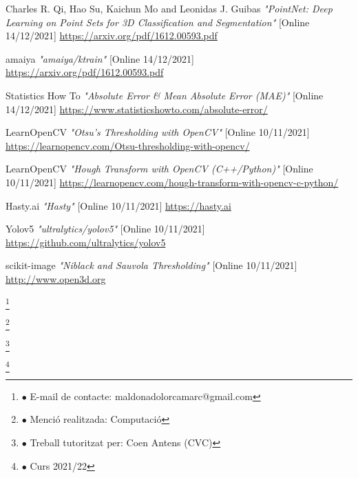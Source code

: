 \documentclass[12pt,a4paper]{article}
\newcommand\blfootnote[1]{%
  \begingroup
  \renewcommand\thefootnote{}\footnote{#1}%
  \addtocounter{footnote}{-1}%
  \endgroup
}
\begin{document}
\begin{thebibliography}{5}
    Charles R. Qi, Hao Su, Kaichun Mo and Leonidas J. Guibas \emph{"PointNet: Deep Learning on Point Sets for 3D Classification and Segmentation"} [Online 14/12/2021]
    \url{https://arxiv.org/pdf/1612.00593.pdf}
    
    amaiya \emph{"amaiya/ktrain"} [Online 14/12/2021]
    \url{https://arxiv.org/pdf/1612.00593.pdf}

    Statistics How To \emph{"Absolute Error & Mean Absolute Error (MAE)"} [Online 14/12/2021]
    \url{https://www.statisticshowto.com/absolute-error/}
    
    LearnOpenCV \emph{"Otsu’s Thresholding with OpenCV"} [Online 10/11/2021]
    \url{https://learnopencv.com/Otsu-thresholding-with-opencv/}

    LearnOpenCV \emph{"Hough Transform with OpenCV (C++/Python)"} [Online 10/11/2021]
    \url{https://learnopencv.com/hough-transform-with-opencv-c-python/}

    Hasty.ai \emph{"Hasty"} [Online 10/11/2021]
    \url{https://hasty.ai}

    Yolov5 \emph{"ultralytics/yolov5"} [Online 10/11/2021]
    \url{https://github.com/ultralytics/yolov5}

    scikit-image \emph{"Niblack and Sauvola Thresholding"} [Online 10/11/2021]
    \url{http://www.open3d.org}


\end{thebibliography}




\setcounter{section}{1}

\blfootnote{$\bullet$ E-mail de contacte: maldonadolorcamarc@gmail.com}
\blfootnote{$\bullet$ Menció realitzada: Computació}
\blfootnote{$\bullet$ Treball tutoritzat per: Coen Antens (CVC)}
\blfootnote{$\bullet$ Curs 2021/22}
\end{document}
